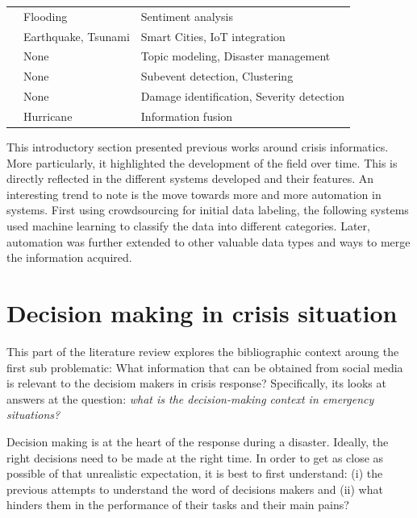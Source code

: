 \begin{table}[bp]
\begin{tabular}{m{} m{} m{}}
        \cite{raginiBigDataAnalytics2018}               & Flooding              & Sentiment analysis                                       \\
        \cite{shahDisasterResilientSmart2019}           & Earthquake, Tsunami   & Smart Cities, IoT integration                            \\
        \cite{grunder-fahrerTopicsTopicalPhases2018}    & None                  & Topic modeling, Disaster management                      \\
        \cite{wuStreamExplorerMultiStageSystem2018}     & None                  & Subevent detection, Clustering                           \\
        \cite{agarwalCrisisDIASMultimodalDamage2020}    & None                  & Damage identification, Severity detection                \\
        \cite{alamDescriptiveVisualSummaries2020}       & Hurricane             & Information fusion                                       \\
        \bottomrule
    \end{tabular}
    \label{table:crisis-informatic-main-articles}
\end{table}

This introductory section presented previous works around crisis informatics.
More particularly, it highlighted the development of the field over time.
This is directly reflected in the different systems developed and their features.
An interesting trend to note is the move towards more and more automation in systems.
First using crowdsourcing for initial data labeling, the following systems used machine learning to classify the data into different categories.
Later, automation was further extended to other valuable data types and ways to merge the information acquired.

\section{Decision making in crisis situation}
This part of the literature review explores the bibliographic context aroung the first sub problematic: What information that can be obtained from social media is relevant to the decisiom makers in crisis response?
Specifically, its looks at answers at the question: \emph{what is the decision-making context in emergency situations?}

Decision making is at the heart of the response during a disaster.
Ideally, the right decisions need to be made at the right time.
In order to get as close as possible of that unrealistic expectation, it is best to first
understand: (i) the previous attempts to understand the word of decisions makers and
(ii) what hinders them in the performance of their tasks and their main pains?

